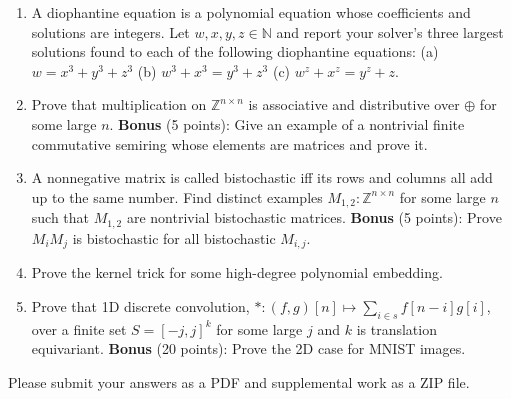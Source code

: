 \documentclass[11pt]{article}
\begin{document}
    \begin{enumerate}
        \item A diophantine equation is a polynomial equation whose coefficients and solutions are integers. Let $w, x, y, z \in \mathbb{N}$ and report your solver's three largest solutions found to each of the following diophantine equations: (a) $w = x^3+y^3+z^3$ (b) $w^3 + x^3 = y^3+z^3$ (c) $w^z + x^z = y^z + z$.
        \item Prove that multiplication on $\mathbb{Z}^{n\times n}$ is associative and distributive over $\oplus$ for some large $n$. \textbf{Bonus} (5 points): Give an example of a nontrivial finite commutative semiring whose elements are matrices and prove it.
        \item A nonnegative matrix is called bistochastic iff its rows and columns all add up to the same number. Find distinct examples $M_{1, 2}: \mathbb{Z}^{n\times n}$ for some large $n$ such that $M_{1,2}$ are nontrivial bistochastic matrices. \textbf{Bonus} (5 points): Prove $M_i M_j$ is bistochastic for all bistochastic $M_{i, j}$.
        \item Prove the kernel trick for some high-degree polynomial embedding.
        \item Prove that 1D discrete convolution, $*: (f, g)[n] \mapsto \sum_{i \in s}f[n-i]g[i]$, over a finite set $S=[-j, j]^{k}$ for some large $j$ and $k$ is translation equivariant. \textbf{Bonus} (20 points): Prove the 2D case for MNIST images.
    \end{enumerate}

    \noindent Please submit your answers as a PDF and supplemental work as a ZIP file.
\end{document}
